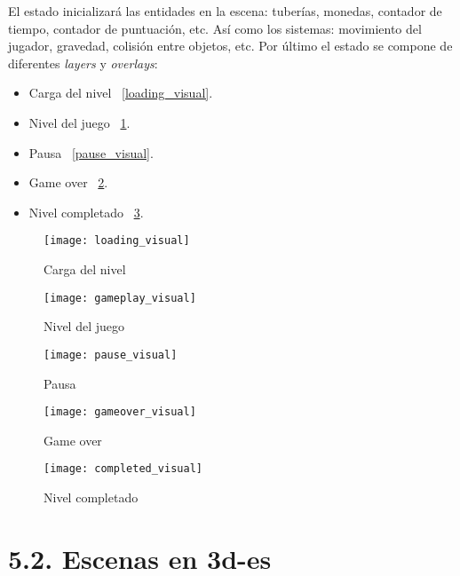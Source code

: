 El estado inicializará las entidades en la escena: tuberías, monedas, contador de tiempo, 
contador de puntuación, etc. Así como los sistemas: movimiento del jugador, gravedad,
colisión entre objetos, etc.
Por último el estado se compone de diferentes \textit{layers} y \textit{overlays}:
\begin{itemize}
    \item Carga del nivel \figurename~\ref{loading_visual}.
    \item Nivel del juego \figurename~\ref{gameplay_visual}.
    \item Pausa \figurename~\ref{pause_visual}.
    \item Game over \figurename~\ref{gameover_visual}.
    \item Nivel completado \figurename~\ref{completed_visual}.
\end{itemize}
\begin{figure}[h!]
    \centering
    \begin{minipage}[c]{.5\textwidth}
        \texttt{[image: loading\_visual]}
        \caption{Carga del nivel}
        \label{loading_visual}
    \end{minipage}%
    \begin{minipage}[c]{.5\textwidth}
        \texttt{[image: gameplay\_visual]}
        \caption{Nivel del juego}
        \label{gameplay_visual}
    \end{minipage}%
\end{figure}
\begin{figure}[h!]
    \centering
    \begin{minipage}[c]{.5\textwidth}
        \texttt{[image: pause\_visual]}
        \caption{Pausa}
        \label{pause_visual}
    \end{minipage}%
    \begin{minipage}[c]{.5\textwidth}
        \texttt{[image: gameover\_visual]}
        \caption{Game over}
        \label{gameover_visual}
    \end{minipage}%
\end{figure}
\begin{figure}[h!]
    \centering
    \texttt{[image: completed\_visual]}
    \caption{Nivel completado}
    \label{completed_visual}
\end{figure}

\vfill
\newpage

\section*{5.2. Escenas en \gls{3d-es}}\label{sec:3d_scenes}

